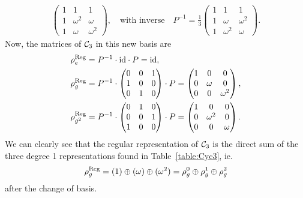 {\begin{example}
\begin{align*}
\begin{pmatrix}
				1&1&1 \\
				1&\omega^2&\omega \\
				1&\omega&\omega^2
			\end{pmatrix}, \quad \text{with inverse} \quad P^{-1} = \frac{1}{3}\begin{pmatrix}
				1&1&1 \\
				1&\omega&\omega^2 \\
				1&\omega^2&\omega
			\end{pmatrix}.
		\end{align*}
		Now, the matrices of $\mathcal{C}_3$ in this new basis are
		\begin{align*}
			\rho_e^{\text{Reg}} &= P^{-1} \cdot \text{id} \cdot P = \text{id}, \\ 
			\rho_g^{\text{Reg}} &= P^{-1}\cdot\begin{pmatrix}
				0&0&1 \\ 1&0&0 \\ 0&1&0
			\end{pmatrix}\cdot P = \begin{pmatrix}
			1&0&0 \\ 0&\omega&0 \\ 0&0&\omega^2
			\end{pmatrix}, \\
			\rho_{g^2}^{\text{Reg}} &= P^{-1}\cdot\begin{pmatrix}
				0&1&0 \\ 0&0&1 \\ 1&0&0 
			\end{pmatrix}\cdot P = \begin{pmatrix}
			1&0&0 \\ 0&\omega^2&0 \\ 0&0&\omega
			\end{pmatrix}.
		\end{align*}
		We can clearly see that the regular representation of $\mathcal{C}_3$ is the direct sum of the three degree 1 representations found in Table~\ref{table:Cyc3}, ie. 
		\begin{align*}
			\rho_g^{\text{Reg}} = (1) \oplus (\omega) \oplus (\omega^2) = \rho^0_g \oplus \rho^1_g \oplus \rho^2_g
		\end{align*}
		after the change of basis.
	\end{example}}
	
